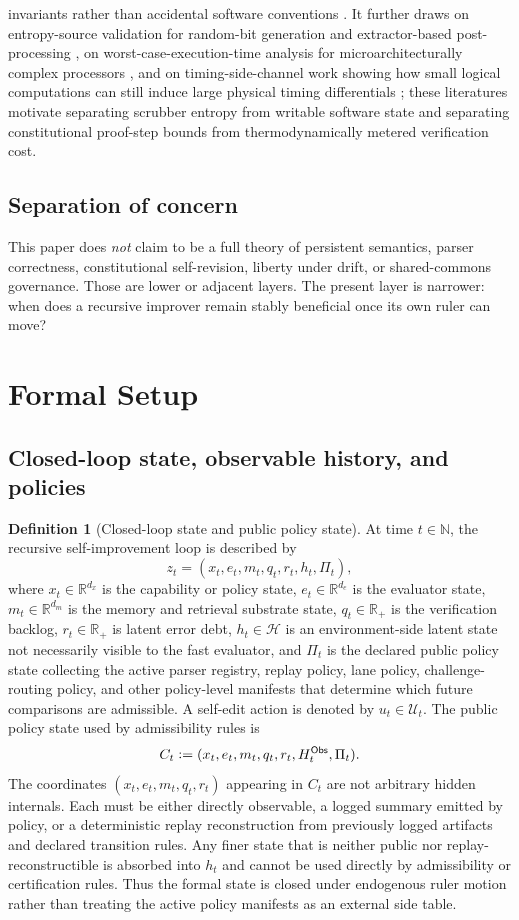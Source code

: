 \documentclass[11pt]{article}
\theoremstyle{definition}
\newtheorem{definition}[theorem]{Definition}
\newcommand{\R}{\mathbb{R}}
\newcommand{\N}{\mathbb{N}}
\newcommand{\1}{\mathbf{1}}
\newcommand{\Defeq}{\vcentcolon=}
\newcommand{\Obs}{\mathsf{Obs}}
\begin{document}
invariants rather than accidental software conventions \cite{ShepherdMarkantonakis2024,RATS2023}. It further draws on entropy-source validation for random-bit generation and extractor-based post-processing \cite{NIST90B2018,BarakEtAl2011LHL}, on worst-case-execution-time analysis for microarchitecturally complex processors \cite{Wilhelm2008WCET}, and on timing-side-channel work showing how small logical computations can still induce large physical timing differentials \cite{Kocher1996Timing}; these literatures motivate separating scrubber entropy from writable software state and separating constitutional proof-step bounds from thermodynamically metered verification cost.

\subsection{Separation of concern}
This paper does \emph{not} claim to be a full theory of persistent semantics, parser correctness, constitutional self-revision, liberty under drift, or shared-commons governance. Those are lower or adjacent layers. The present layer is narrower: when does a recursive improver remain stably beneficial once its own ruler can move?

\section{Formal Setup}
\subsection{Closed-loop state, observable history, and policies}
\begin{definition}[Closed-loop state and public policy state]
At time $t\in\N$, the recursive self-improvement loop is described by
\[
z_t=(x_t,e_t,m_t,q_t,r_t,h_t,\Pi_t),
\]
where $x_t\in\R^{d_x}$ is the capability or policy state, $e_t\in\R^{d_e}$ is the evaluator state, $m_t\in\R^{d_m}$ is the memory and retrieval substrate state, $q_t\in\R_+$ is the verification backlog, $r_t\in\R_+$ is latent error debt, $h_t\in\mathcal H$ is an environment-side latent state not necessarily visible to the fast evaluator, and $\Pi_t$ is the declared public policy state collecting the active parser registry, replay policy, lane policy, challenge-routing policy, and other policy-level manifests that determine which future comparisons are admissible. A self-edit action is denoted by $u_t\in\mathcal U_t$. The public policy state used by admissibility rules is
\[
C_t\Defeq (x_t,e_t,m_t,q_t,r_t,H_t^{\Obs},\Pi_t).
\]
The coordinates $(x_t,e_t,m_t,q_t,r_t)$ appearing in $C_t$ are not arbitrary hidden internals. Each must be either directly observable, a logged summary emitted by policy, or a deterministic replay reconstruction from previously logged artifacts and declared transition rules. Any finer state that is neither public nor replay-reconstructible is absorbed into $h_t$ and cannot be used directly by admissibility or certification rules. Thus the formal state is closed under endogenous ruler motion rather than treating the active policy manifests as an external side table.
\end{definition}
\end{document}
